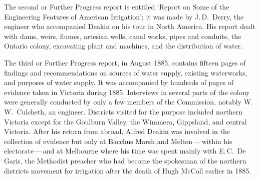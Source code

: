 The second or Further Progress report is entitled `Report on Some of
the Engineering Features of American Irrigation'; it was made by
J.\,D.~Derry,  the engineer who accompanied
Deakin on his tour in North America.  His report dealt with dams,
weirs, flumes, artesian wells, canal works, pipes and conduits, the
Ontario  colony, excavating plant and machines, and the
distribution of water.

The third or Further Progress report, in August 1885, contains fifteen
pages of findings and recommendations on sources of water supply,
existing waterworks, and purposes of water supply.  It was accompanied
by hundreds of pages of evidence taken in Victoria during 1885.
Interviews in several parts of the colony were generally conducted by
only a few members of the Commission, notably W.\,W.~Culcheth,
 an
engineer.  Districts visited for the purpose included northern
Victoria except for the Goulburn Valley,  the
Wimmera,  Gippsland,  and
central Victoria.  After his return from abroad, Alfred Deakin was
involved in the collection of evidence but only at Bacchus Marsh
 and  
Melton\,---\,within his electorate\,---\,and at Melbourne where his
time was spent mainly with E.\,C.~De Garis, 
the Methodist preacher who had become the spokesman of the northern
districts movement for irrigation after the death of Hugh McColl
earlier in 1885.

